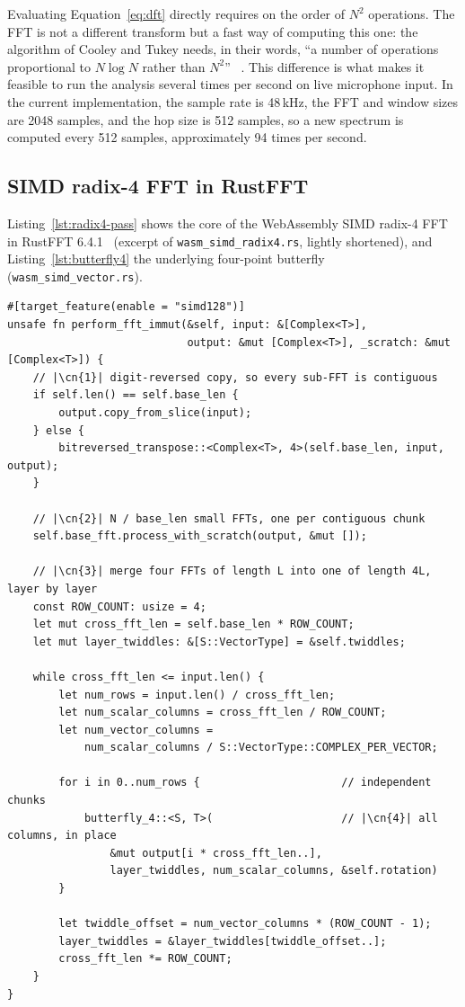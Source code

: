 Evaluating Equation~\ref{eq:dft} directly requires on the order of $N^2$
operations. The FFT is not a different transform but a fast way of computing
this one: the algorithm of Cooley and Tukey needs, in their words, ``a number
of operations proportional to $N \log N$ rather than $N^2$''%
~\cite{cooley1965algorithm}. This difference is what makes it feasible to run
the analysis several times per second on live microphone input. In the
current implementation, the sample rate is 48\,kHz, the FFT and window sizes
are 2048 samples, and the hop size is 512 samples, so a new spectrum is
computed every 512 samples, approximately 94 times per second.

\subsection{SIMD radix-4 FFT in RustFFT}
\label{sec:simd-radix4}

Listing~\ref{lst:radix4-pass} shows the core of the WebAssembly SIMD
radix-4 FFT in RustFFT 6.4.1~\cite{rustfft} (excerpt of
\texttt{wasm\_simd\_radix4.rs}, lightly shortened), and
Listing~\ref{lst:butterfly4} the underlying four-point butterfly
(\texttt{wasm\_simd\_vector.rs}).

\begin{lstlisting}[style=rustcode,
  caption={Layered radix-4 pass of the WASM SIMD FFT (excerpt).},
  label={lst:radix4-pass}]
#[target_feature(enable = "simd128")]
unsafe fn perform_fft_immut(&self, input: &[Complex<T>],
                            output: &mut [Complex<T>], _scratch: &mut [Complex<T>]) {
    // |\cn{1}| digit-reversed copy, so every sub-FFT is contiguous
    if self.len() == self.base_len {
        output.copy_from_slice(input);
    } else {
        bitreversed_transpose::<Complex<T>, 4>(self.base_len, input, output);
    }

    // |\cn{2}| N / base_len small FFTs, one per contiguous chunk
    self.base_fft.process_with_scratch(output, &mut []);

    // |\cn{3}| merge four FFTs of length L into one of length 4L, layer by layer
    const ROW_COUNT: usize = 4;
    let mut cross_fft_len = self.base_len * ROW_COUNT;
    let mut layer_twiddles: &[S::VectorType] = &self.twiddles;

    while cross_fft_len <= input.len() {
        let num_rows = input.len() / cross_fft_len;
        let num_scalar_columns = cross_fft_len / ROW_COUNT;
        let num_vector_columns =
            num_scalar_columns / S::VectorType::COMPLEX_PER_VECTOR;

        for i in 0..num_rows {                      // independent chunks
            butterfly_4::<S, T>(                    // |\cn{4}| all columns, in place
                &mut output[i * cross_fft_len..],
                layer_twiddles, num_scalar_columns, &self.rotation)
        }

        let twiddle_offset = num_vector_columns * (ROW_COUNT - 1);
        layer_twiddles = &layer_twiddles[twiddle_offset..];
        cross_fft_len *= ROW_COUNT;
    }
}
\end{lstlisting}

